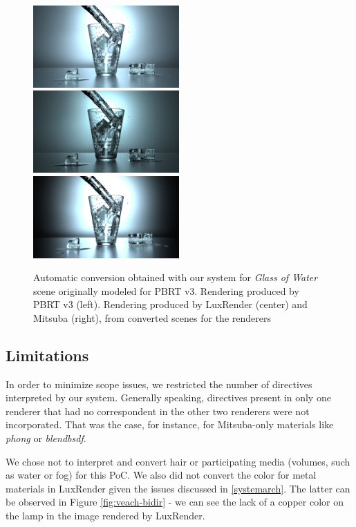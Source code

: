 \begin{figure}
\centering
\includegraphics[width=2.2in]{figs/4_results/glass_of_water/1_from_pbrt.png}
\includegraphics[width=2.2in]{figs/4_results/glass_of_water/2_to_lux.png}
\includegraphics[width=2.2in]{figs/4_results/glass_of_water/3_to_mitsuba.png}
\caption{Automatic conversion obtained with our system for \textit{Glass of Water}
scene originally modeled for PBRT v3. Rendering produced by PBRT v3 (left).
Rendering produced by LuxRender (center) and Mitsuba (right),
from converted scenes for the renderers}
\label{fig:glass-of-water}
\end{figure}

\subsection{Limitations}
In order to minimize scope issues, we restricted the number of directives 
interpreted by our system. Generally speaking, directives present in only one 
renderer that had no correspondent in the other two renderers were not 
incorporated. That was the case, for instance, for Mitsuba-only materials like 
\textit{phong} or \textit{blendbsdf}. 

We chose not to interpret and convert hair or participating media (volumes, such 
as water or fog) for this PoC. We also did not convert the color for metal 
materials in LuxRender given the issues discussed in \ref{systemarch}. The 
latter can be observed in Figure \ref{fig:veach-bidir} - we can see the lack of a 
copper color on the lamp in the image rendered by LuxRender.




